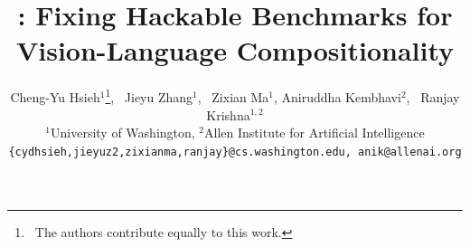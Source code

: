 \documentclass{article}
\title{\method: Fixing Hackable Benchmarks for Vision-Language Compositionality}
\author{%
Cheng-Yu Hsieh$^{1}$\thanks{\ The authors contribute equally to this work.}, \
Jieyu Zhang$^{1}$\footnotemark[1], \
Zixian Ma$^{1}$,
Aniruddha Kembhavi$^{2}$, \
Ranjay Krishna$^{1,2}$\\
$^1$University of Washington, 
$^2$Allen Institute for Artificial Intelligence\\
\texttt{\{cydhsieh,jieyuz2,zixianma,ranjay\}@cs.washington.edu, anik@allenai.org}
}
\begin{document}
\maketitle


\begin{abstract}

\end{abstract}









\clearpage 




% 

\clearpage

\appendix

\end{document}
